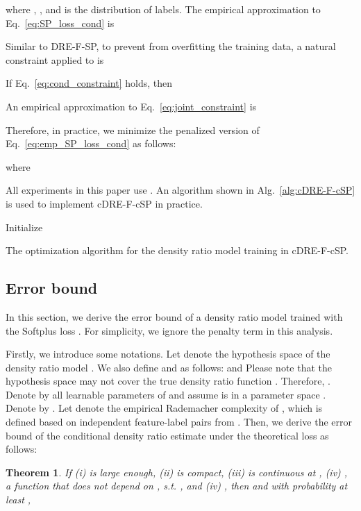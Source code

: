 \documentclass[10pt, twocolumn]{article}
\newtheorem{theorem}{Theorem}
\theoremstyle{definition}
\begin{document}
where , , and  is the distribution of labels. The empirical approximation to Eq.\ \eqref{eq:SP_loss_cond} is 

Similar to DRE-F-SP, to prevent  from overfitting the training data, a natural constraint applied to  is 

If Eq.\ \eqref{eq:cond_constraint} holds, then

An empirical approximation to Eq.\ \eqref{eq:joint_constraint} is

Therefore, in practice, we minimize the penalized version of Eq.\ \eqref{eq:emp_SP_loss_cond} as follows:

where 

All experiments in this paper use . An algorithm shown in Alg.\ \ref{alg:cDRE-F-cSP} is used to implement cDRE-F-cSP in practice.

\begin{algorithm}[!htbp]
	\footnotesize
	\SetAlgoLined
	Initialize \;
	\caption{The optimization algorithm for the density ratio model training in cDRE-F-cSP.}
	\label{alg:cDRE-F-cSP}
\end{algorithm}



\subsection{Error bound}\label{sec:cDRE_error_bound}
In this section, we derive the error bound of a density ratio model  trained with the Softplus loss . For simplicity, we ignore the penalty term in this analysis. 

Firstly, we introduce some notations. Let  denote the hypothesis space of the density ratio model . We also define  and  as follows:
 and 
Please note that the hypothesis space  may not cover the true density ratio function . Therefore, . Denote by  all learnable parameters of  and assume  is in a parameter space . Denote  by . Let  denote the empirical Rademacher complexity of , which is defined based on independent feature-label pairs  from . Then,
we derive the error bound of the conditional density ratio estimate  under the theoretical loss as follows:
\begin{theorem}
	\label{thm:error_bound}
	If (i)  is large enough, (ii)  is compact, (iii)  is continuous at , (iv) ,  a function  that does not depend on , s.t. , and (iv) , then  and  with probability at least ,

\end{theorem}
\end{document}
